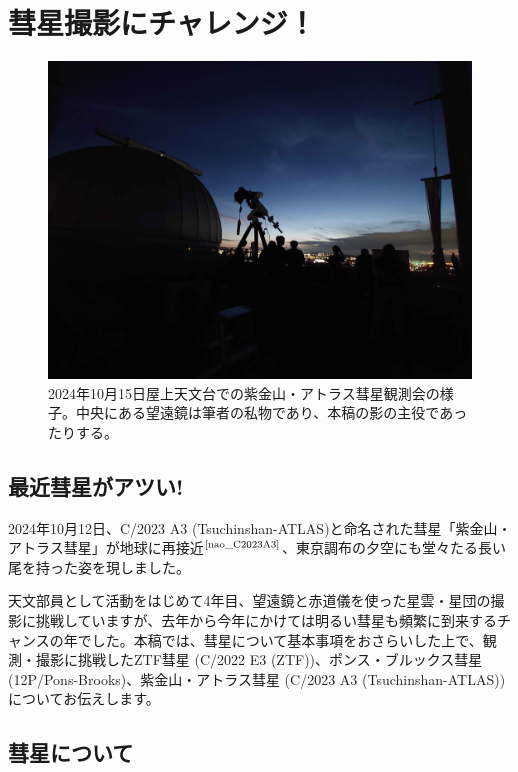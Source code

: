 \documentclass{supernova_pre}
\begin{document}
\chapter{彗星撮影にチャレンジ！} %

\begin{figure}
  \centering
  \includegraphics[width=\textwidth]{img/DSC_2704.jpg}
  \caption{2024年10月15日屋上天文台での紫金山・アトラス彗星観測会の様子。中央にある望遠鏡は筆者の私物であり、本稿の影の主役であったりする。}
\end{figure}
\section{最近彗星がアツい!}

2024年10月12日、C/2023 A3 (Tsuchinshan-ATLAS)と命名された彗星「紫金山・アトラス彗星」が地球に再接近$^\text{\cite{nao_C2023A3}}$、東京調布の夕空にも堂々たる長い尾を持った姿を現しました。

天文部員として活動をはじめて4年目、望遠鏡と赤道儀を使った星雲・星団の撮影に挑戦していますが、去年から今年にかけては明るい彗星も頻繁に到来するチャンスの年でした。本稿では、彗星について基本事項をおさらいした上で、観測・撮影に挑戦したZTF彗星 (C/2022 E3 (ZTF))、ポンス・ブルックス彗星 (12P/Pons-Brooks)、紫金山・アトラス彗星 (C/2023 A3 (Tsuchinshan-ATLAS))についてお伝えします。

\section{彗星について}
\end{document}
